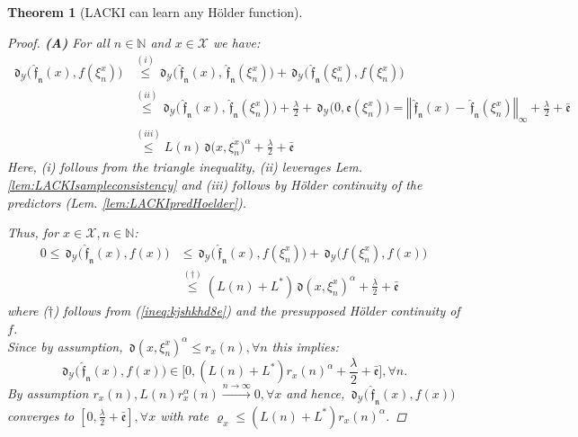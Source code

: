 \documentclass{article} %
\newtheorem{thm}{Theorem}[section]
\theoremstyle{definition}
\theoremstyle{remark}
\newcommand{\norm}[1]{\left\Vert#1\right\Vert}
\newcommand{\nat}{\mathbb N}
\newcommand{\vc}[1]{#1}
\newcommand{\ball}[2]{\ensuremath{\mathfrak B_{\vc{#1}} \bigl( #2\bigr) }}
\newcommand{\inspace}{\ensuremath{ \mathcal X}}
\newcommand{\outspace}{\ensuremath{ \mathcal Y}}
\newcommand{\metric}{\, \mathfrak{d}} %
\newcommand{\Metrici}[2]{\metric\bigl(#1,#2\bigr) }
\newcommand{\predfn}{\, \mathfrak{  \hat f_n}} %
\newcommand{\hexp}{{ \alpha }}%
\newcommand{\obserr}{\mathfrak e} %
\newcommand{\obserrbnd}{\bar{\mathfrak e}}
\begin{document}
\begin{thm}[LACKI can learn any H\"older function]
\begin{proof}
\textbf{(A)} 
For all $n \in \nat$ and $x \in \inspace$ we have:
\begin{align} \metric_\outspace\bigl(\predfn(x) , f(\xi_n^x)  \bigr)
&\stackrel{(i)}{\leq} 
\metric_\outspace\bigl(\predfn(x) , \predfn(\xi_n^x)  \bigr) + \metric_\outspace\bigl(\predfn(\xi_n^x) , f(\xi_n^x)  \bigr)\\
&\stackrel{(ii)}{\leq} 
\metric_\outspace\bigl(\predfn(x) , \predfn(\xi_n^x)  \bigr) + \frac \lambda 2 + \metric_\outspace\bigl(0, \obserr(\xi_n^x) \bigr)
\stackrel{ }{=} 
\norm{\predfn(x) - \predfn(\xi_n^x) }_\infty + \frac \lambda 2 + \obserrbnd\\
&\stackrel{(iii) }{\leq} L(n)
\Metrici{x}{\xi_n^x }^\hexp + \frac \lambda 2 + \obserrbnd \label{ineq:kjshkhd8e}
\end{align}
Here, (i) follows from the triangle inequality, (ii) leverages Lem. \ref{lem:LACKIsampleconsistency} and (iii) follows by H\"older continuity of the predictors (Lem. \ref{lem:LACKIpredHoelder}).

%
Thus, for $x \in \inspace, n \in \nat$:
%
\begin{align}
0 \leq \metric_\outspace\bigl(\predfn(x) , f(x)\bigr) &\leq \metric_\outspace\bigl(\predfn(x) ,  f(\xi_n^x)  \bigr) + \metric_\outspace\bigl(f(\xi_n^x) , f(x)\bigr)\\
&\stackrel{(\dagger)}{\leq} (L(n)+ L^*) \metric(x,\xi_n^x )^\hexp +  \frac \lambda 2 +\obserrbnd
\end{align}
where ($\dagger$) follows from (\ref{ineq:kjshkhd8e}) and the presupposed H\"older continuity of $f$. \\

Since by assumption, $ \metric(x,\xi_n^x )^\hexp \leq r_x(n) 
, \forall n$ this implies:
\begin{equation}
\metric_\outspace\bigl(\predfn(x) , f(x)\bigr)  \in \bigl[0, (L(n)+ L^*) r_x(n)^\hexp +  \frac \lambda 2 +\obserrbnd \bigr], \forall n. \end{equation} 
By assumption $ r_x(n), L(n) r_x^\hexp(n) \stackrel{n \to \infty}{\to} 0, \forall x$ and hence, $\metric_\outspace\bigl(\predfn(x) , f(x)\bigr)$ converges to $  [0,\frac \lambda 2 +\obserrbnd], \forall x$ with rate $\varrho_x \leq(L(n)+ L^*) r_x(n)^\hexp $.
%
%
%


\end{proof}
\end{thm}
\end{document}

